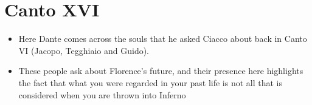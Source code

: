 \documentclass[10pt]{article}
\begin{document}
	\section{Canto XVI}
	\begin{itemize}
		\item Here Dante comes across the souls that he asked Ciacco about back in Canto VI (Jacopo, Tegghiaio
			and Guido).
		\item These people ask about Florence's future, and their presence here highlights the fact that 
			what you were regarded in your past life is not all that is considered when you are thrown 
			into Inferno
	\end{itemize}
\end{document}
